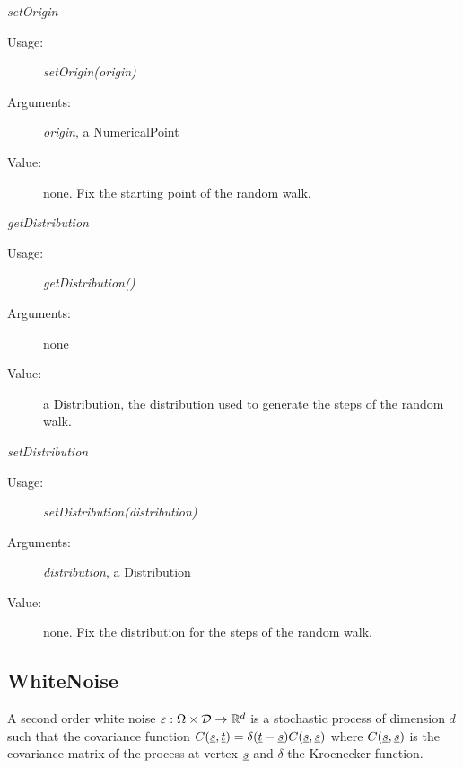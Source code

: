 \begin{description}
\begin{description}
\item \textit{setOrigin}
\begin{description}
\item[Usage:] \textit{setOrigin(origin)}
\item[Arguments:] \textit{origin}, a NumericalPoint
\item[Value:] none. Fix the starting point of the random walk.
\end{description}
\bigskip

\end{description}

\begin{description}

\item \textit{getDistribution}
\begin{description}
\item[Usage:] \textit{getDistribution()}
\item[Arguments:] none
\item[Value:] a Distribution, the distribution used to generate the steps of the random walk.
\end{description}
\bigskip

\item \textit{setDistribution}
\begin{description}
\item[Usage:] \textit{setDistribution(distribution)}
\item[Arguments:] \textit{distribution}, a Distribution
\item[Value:] none. Fix the distribution for the steps of the random walk.
\end{description}
\bigskip

\end{description}

\end{description}



\newpage

\subsection{WhiteNoise}



A second order white noise $\varepsilon: \Omega \times {\mathcal D} \rightarrow {\mathbb R}^d$  is a stochastic process of dimension $d$ such that the covariance function $C({\underline{s}},{\underline{t}})=\delta({\underline{t}}-{\underline{s}})C({\underline{s}},{\underline{s}})$ where $C({\underline{s}},{\underline{s}})$  is the covariance matrix of the process at vertex ${\underline{s}}$ and $\delta$ the Kroenecker function.\\

